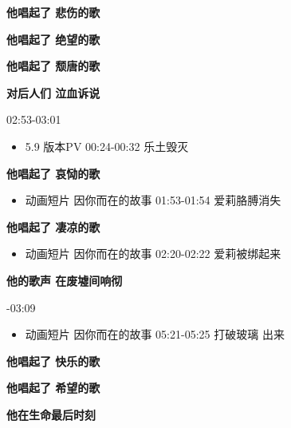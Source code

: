 \documentclass[a4paper]{article}
\begin{document}

\textbf{他唱起了 悲伤的歌}

\textbf{他唱起了 绝望的歌}

\textbf{他唱起了 颓唐的歌}

\textbf{对后人们 泣血诉说}

02:53-03:01

\begin{itemize}
    \item 5.9 版本PV 00:24-00:32 乐土毁灭
\end{itemize}


\textbf{他唱起了 哀恸的歌}

\begin{itemize}
    \item 动画短片 因你而在的故事 01:53-01:54 爱莉胳膊消失
\end{itemize}

\textbf{他唱起了 凄凉的歌}

\begin{itemize}
    \item 动画短片 因你而在的故事 02:20-02:22 爱莉被绑起来
\end{itemize}

\textbf{他的歌声 在废墟间响彻}

-03:09

\begin{itemize}
    \item 动画短片 因你而在的故事 05:21-05:25 打破玻璃 出来
\end{itemize}

\textbf{他唱起了 快乐的歌}

\textbf{他唱起了 希望的歌}

\textbf{他在生命最后时刻}
\end{document}
